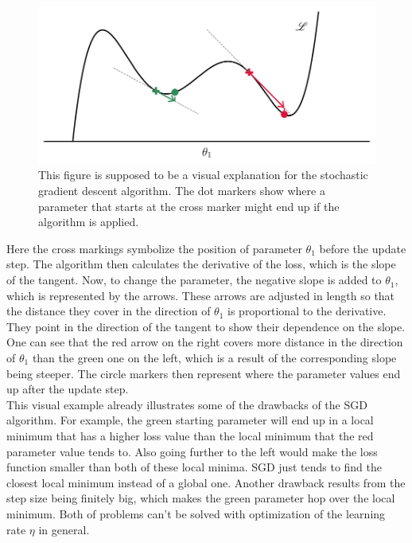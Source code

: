 \begin{figure}
	\centering
	\includegraphics[width = 14cm]{text/MachineLearningBasics/plots/sgd_plot.pdf}
	\caption{This figure is supposed to be a visual explanation for the stochastic gradient descent algorithm. The dot markers show where a parameter that starts at the cross marker might end up if the algorithm is applied.}
	\label{fig:sgd_explanation_plot}
\end{figure}
Here the cross markings symbolize the position of parameter $\theta_1$ before the update step. The algorithm then calculates the derivative of the loss, which is the slope of the tangent. Now, to change the parameter, the negative slope is added to $\theta_1$, which is represented by the arrows. These arrows are adjusted in length so that the distance they cover in the direction of $\theta_1$ is proportional to the derivative. They point in the direction of the tangent to show their dependence on the slope. One can see that the red arrow on the right covers more distance in the direction of $\theta_1$ than the green one on the left, which is a result of the corresponding slope being steeper. The circle markers then represent where the parameter values end up after the update step.\\
This visual example already illustrates some of the drawbacks of the SGD algorithm. For example, the green starting parameter will end up in a local minimum that has a higher loss value than the local minimum that the red parameter value tends to. Also going further to the left would make the loss function smaller than both of these local minima. SGD just tends to find the closest local minimum instead of a global one. Another drawback results from the step size being finitely big, which makes the green parameter hop over the local minimum. Both of problems can't be solved with optimization of the learning rate $\eta$ in general.

